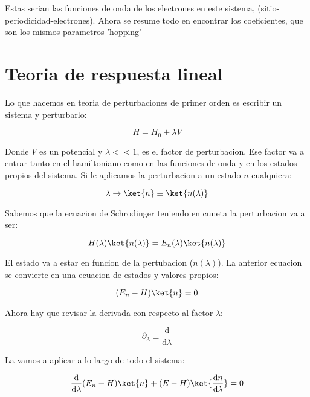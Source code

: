 \documentclass[11pt,fleqn]{book}
\begin{document}
Estas serian las funciones de onda de los electrones en este sistema, (sitio-periodicidad-electrones). Ahora se resume todo en encontrar los coeficientes, que son los mismos parametros 'hopping'


\section{Teoria de respuesta lineal}

Lo que hacemos en teoria de perturbaciones de primer orden es escribir un sistema y perturbarlo:

\begin{equation}
    H=H_{0}+\lambda V
\end{equation}

Donde $V$ es un potencial y $\lambda<<1$, es el factor de perturbacion. Ese factor va a entrar tanto en el hamiltoniano como en las funciones de onda y en los estados propios del sistema. Si le aplicamos la perturbacion a un estado $n$ cualquiera:

\begin{equation*}
    \lambda\rightarrow\ket{n}\equiv\ket{n(\lambda)}
\end{equation*}

Sabemos que la ecuacion de Schrodinger teniendo en cuneta la perturbacion va a ser:

\begin{equation}
    H(\lambda)\ket{n(\lambda)}=E_{n}(\lambda)\ket{n(\lambda)}
\end{equation}

El estado va a estar en funcion de la pertubacion ($n(\lambda)$). La anterior ecuacion se convierte en una ecuacion de estados y valores propios:

\begin{equation}
    (E_{n}-H)\ket{n}=0
\end{equation}

Ahora hay que revisar la derivada con respecto al factor $\lambda$:

\begin{equation*}
    \partial_{\lambda}\equiv\frac{\mathrm{d}}{\mathrm{d}\lambda}
\end{equation*}

La vamos a aplicar a lo largo de todo el sistema:

\begin{equation}
    \frac{\mathrm{d}}{\mathrm{d}\lambda}(E_{n}-H)\ket{n}+(E-H)\ket{\frac{\mathrm{d}n}{\mathrm{d}\lambda}}=0
\end{equation}
\end{document}
